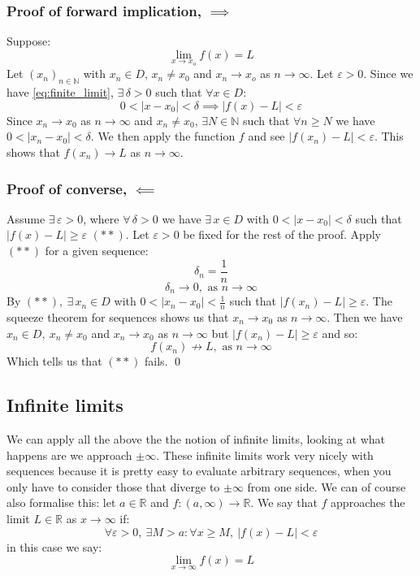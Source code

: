 \documentclass[12pt]{article}
\newcommand{\seq}[2]{(#1_#2)_{#2\in\mathbb{N}}}
\begin{document}
\subsubsection*{Proof of forward implication, \(\implies\)}
Suppose:
\begin{equation*}
    \lim_{x\to x_o}f(x)=L
    \tag{*}
    \label{eq:finite_limit}
\end{equation*}
Let \(\seq{x}{n}\) with \(x_n\in D\), \(x_n\ne x_0\) and \(x_n\to x_o\) as \(n\to \infty\). Let \(\varepsilon >0\). Since we have \eqref{eq:finite_limit}, \(\exists\,\delta>0\) such that \(\forall x\in D\):
\[0<|x-x_0|<\delta\implies |f(x)-L|<\varepsilon\]
Since \(x_n\to x_0\) as \(n\to\infty\) and \(x_n\ne x_0\), \(\exists N\in\mathbb{N}\) such that \(\forall n\geq N\) we have \(0<|x_n-x_0|<\delta\). We then apply the function \(f\) and see \(|f(x_n)-L|<\varepsilon\). This shows that \(f(x_n)\to L\) as \(n\to\infty\).
\subsubsection*{Proof of converse, \(\impliedby\)}
Assume \(\exists\,\varepsilon>0\), where \(\forall\,\delta>0\) we have \(\exists \,x\in D\) with \(0<|x-x_0|<\delta\) such that \(|f(x)-L|\geq \varepsilon\) \((**)\). Let \(\varepsilon>0\) be fixed for the rest of the proof. Apply \((**)\) for a given sequence:
\[\delta_n=\frac{1}{n}\]
\[\delta_n\to0,\text{ as }n\to\infty\]
By \((**),\ \exists\,x_n\in D\) with \(0<|x_n-x_0|<\frac{1}{n}\) such that \(|f(x_n)-L|\geq\varepsilon\). The squeeze theorem for sequences shows us that \(x_n\to x_0\) as \(n\to\infty\). Then we have \(x_n\in D,\ x_n\ne x_0\) and \(x_n\to x_0\) as \(n\to\infty\) but \(|f(x_n)-L|\geq \varepsilon\) and so:
\[f(x_n)\not\to L,\text{ as }n\to\infty\]
Which tells us that \((**)\) fails.
\qed
\subsection*{Infinite limits}
We can apply all the above the the notion of infinite limits, looking at what happens are we approach \(\pm\infty\). These infinite limits work very nicely with sequences because it is pretty easy to evaluate arbitrary sequences, when you only have to consider those that diverge to \(\pm\infty\) from one side. We can of course also formalise this: let \(a\in\mathbb{R}\) and \(f:(a,\infty)\to\mathbb{R}\). We say that \(f\) approaches the limit \(L\in\mathbb{R}\) as \(x\to\infty\) if:
\[\forall\varepsilon>0,\ \exists M>a: \forall x\geq M, \ |f(x)-L|<\varepsilon\]
in this case we say:
\[\lim_{x\to\infty}f(x)=L\]
\end{document}
